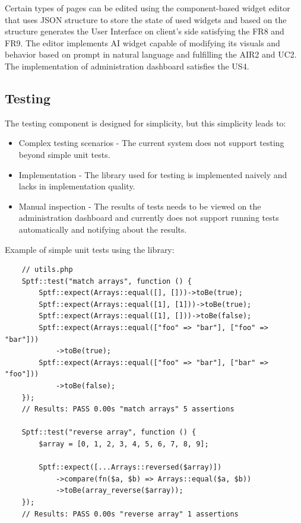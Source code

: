 Certain types of pages can be edited using the component-based widget editor that uses JSON structure to store the state of used widgets
and based on the structure generates the User Interface on client's side satisfying the FR8 and FR9.
The editor implements AI widget capable of modifying its visuals and behavior based on prompt in natural language and fulfilling the AIR2 and UC2.
The implementation of administration dashboard satisfies the US4.



\subsection{Testing}\label{subsec:testing}
The testing component is designed for simplicity, but this simplicity leads to:

\begin{itemize}
    \item Complex testing scenarios - The current system does not support testing beyond simple unit tests.
    \item Implementation - The library used for testing is implemented naively and lacks in implementation quality.
    \item Manual inspection - The results of tests needs to be viewed on the administration dashboard and currently
        does not support running tests automatically and notifying about the results.
\end{itemize}

Example of simple unit tests using the library:
\begin{verbatim}
    // utils.php
    Sptf::test("match arrays", function () {
        Sptf::expect(Arrays::equal([], []))->toBe(true);
        Sptf::expect(Arrays::equal([1], [1]))->toBe(true);
        Sptf::expect(Arrays::equal([1], []))->toBe(false);
        Sptf::expect(Arrays::equal(["foo" => "bar"], ["foo" => "bar"]))
            ->toBe(true);
        Sptf::expect(Arrays::equal(["foo" => "bar"], ["bar" => "foo"]))
            ->toBe(false);
    });
    // Results: PASS 0.00s "match arrays" 5 assertions

    Sptf::test("reverse array", function () {
        $array = [0, 1, 2, 3, 4, 5, 6, 7, 8, 9];

        Sptf::expect([...Arrays::reversed($array)])
            ->compare(fn($a, $b) => Arrays::equal($a, $b))
            ->toBe(array_reverse($array));
    });
    // Results: PASS 0.00s "reverse array" 1 assertions
\end{verbatim}



